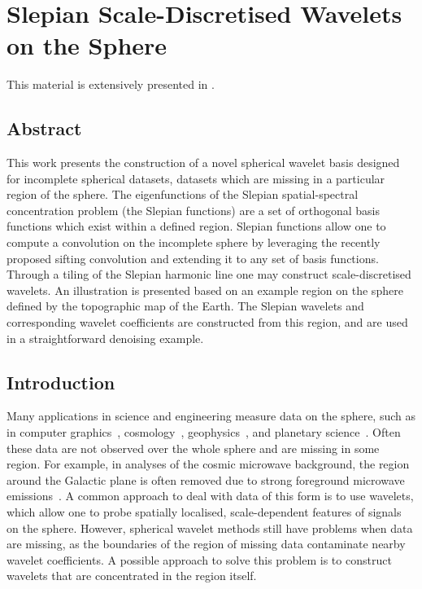 \chapter{Slepian Scale-Discretised Wavelets on the Sphere}\label{sec:chapter3}

This material is extensively presented in \cite{Roddy2021a}.

\section*{Abstract}

This work presents the construction of a novel spherical wavelet basis designed for incomplete spherical datasets, \ie{} datasets which are missing in a particular region of the sphere.
The eigenfunctions of the Slepian spatial-spectral concentration problem (the Slepian functions) are a set of orthogonal basis functions which exist within a defined region.
Slepian functions allow one to compute a convolution on the incomplete sphere by leveraging the recently proposed sifting convolution and extending it to any set of basis functions.
Through a tiling of the Slepian harmonic line one may construct scale-discretised wavelets.
An illustration is presented based on an example region on the sphere defined by the topographic map of the Earth.
The Slepian wavelets and corresponding wavelet coefficients are constructed from this region, and are used in a straightforward denoising example.

\section{Introduction}

Many applications in science and engineering measure data on the sphere, such as in computer graphics~\cite{Ramamoorthi2004}, cosmology~\cite{Bennett1996}, geophysics~\cite{Simons2006}, and planetary science~\cite{Turcotte1981}.
Often these data are not observed over the whole sphere and are missing in some region.
For example, in analyses of the cosmic microwave background, the region around the Galactic plane is often removed due to strong foreground microwave emissions~\cite{Mortlock2002}.
A common approach to deal with data of this form is to use wavelets, which allow one to probe spatially localised, scale-dependent features of signals on the sphere.
However, spherical wavelet methods still have problems when data are missing, as the boundaries of the region of missing data contaminate nearby wavelet coefficients.
A possible approach to solve this problem is to construct wavelets that are concentrated in the region itself.

